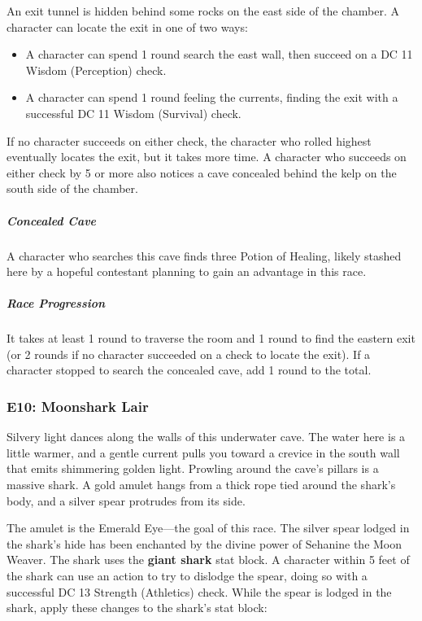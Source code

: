 \documentclass[10pt,a4paper,twoside,bg=print,twocolumn,openany,nodeprecatedcode]{dndbook}
\begin{document}
An exit tunnel is hidden behind some rocks on the east side of the chamber. A character can locate the exit in one of two ways:


\begin{itemize}
\item A character can spend 1 round search the east wall, then succeed on a DC 11 Wisdom (Perception) check.
\item A character can spend 1 round feeling the currents, finding the exit with a successful DC 11 Wisdom (Survival) check.
\end{itemize}

If no character succeeds on either check, the character who rolled highest eventually locates the exit, but it takes more time. A character who succeeds on either check by 5 or more also notices a cave concealed behind the kelp on the south side of the chamber.

\subparagraph{Concealed Cave}
A character who searches this cave finds three Potion of Healing, likely stashed here by a hopeful contestant planning to gain an advantage in this race.

\subparagraph{Race Progression}
It takes at least 1 round to traverse the room and 1 round to find the eastern exit (or 2 rounds if no character succeeded on a check to locate the exit). If a character stopped to search the concealed cave, add 1 round to the total.

\subsubsection{E10: Moonshark Lair}
\begin{DndReadAloud}{}
Silvery light dances along the walls of this underwater cave. The water here is a little warmer, and a gentle current pulls you toward a crevice in the south wall that emits shimmering golden light. Prowling around the cave's pillars is a massive shark. A gold amulet hangs from a thick rope tied around the shark's body, and a silver spear protrudes from its side.

\end{DndReadAloud}

The amulet is the Emerald Eye—the goal of this race. The silver spear lodged in the shark's hide has been enchanted by the divine power of Sehanine the Moon Weaver. The shark uses the \textbf{giant shark} stat block. A character within 5 feet of the shark can use an action to try to dislodge the spear, doing so with a successful DC 13 Strength (Athletics) check. While the spear is lodged in the shark, apply these changes to the shark's stat block:
\end{document}

